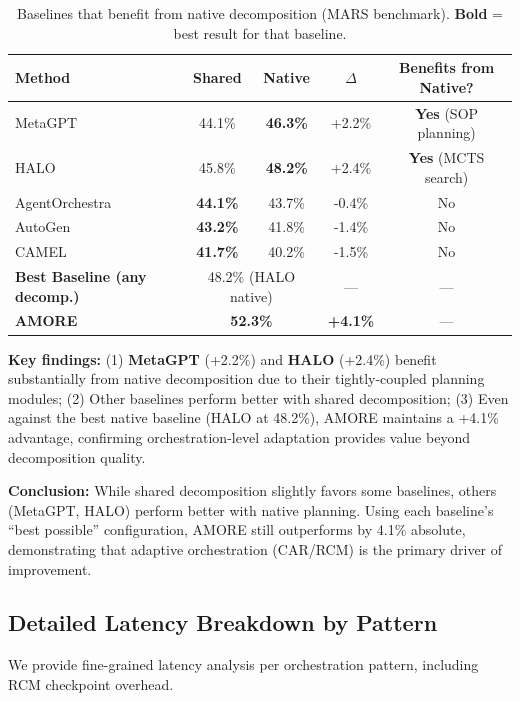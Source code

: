 \documentclass{article}
\theoremstyle{plain}
\theoremstyle{definition}
\theoremstyle{remark}
\begin{document}
\begin{table}[h]
	\caption{Baselines that benefit from native decomposition (MARS benchmark). \textbf{Bold} = best result for that baseline.}
	\label{tab:native-benefit}
	\centering
	\small
	\begin{tabular}{@{}lcccc@{}}
		\toprule
		\textbf{Method} & \textbf{Shared} & \textbf{Native} & \textbf{$\Delta$} & \textbf{Benefits from Native?} \\
		\midrule
		MetaGPT & 44.1\% & \textbf{46.3\%} & +2.2\% & \textbf{Yes} (SOP planning) \\
		HALO & 45.8\% & \textbf{48.2\%} & +2.4\% & \textbf{Yes} (MCTS search) \\
		AgentOrchestra & \textbf{44.1\%} & 43.7\% & -0.4\% & No \\
		AutoGen & \textbf{43.2\%} & 41.8\% & -1.4\% & No \\
		CAMEL & \textbf{41.7\%} & 40.2\% & -1.5\% & No \\
		\midrule
		\textbf{Best Baseline (any decomp.)} & \multicolumn{2}{c}{48.2\% (HALO native)} & --- & --- \\
		\textbf{AMORE} & \multicolumn{2}{c}{\textbf{52.3\%}} & \textbf{+4.1\%} & --- \\
		\bottomrule
	\end{tabular}
\end{table}

\textbf{Key findings:} (1) \textbf{MetaGPT} (+2.2\%) and \textbf{HALO} (+2.4\%) benefit substantially from native decomposition due to their tightly-coupled planning modules; (2) Other baselines perform better with shared decomposition; (3) Even against the best native baseline (HALO at 48.2\%), AMORE maintains a +4.1\% advantage, confirming orchestration-level adaptation provides value beyond decomposition quality.

\textbf{Conclusion:} While shared decomposition slightly favors some baselines, others (MetaGPT, HALO) perform better with native planning. Using each baseline's ``best possible'' configuration, AMORE still outperforms by 4.1\% absolute, demonstrating that adaptive orchestration (CAR/RCM) is the primary driver of improvement.

\subsection{Detailed Latency Breakdown by Pattern}
\label{sec:latency_per_pattern}

We provide fine-grained latency analysis per orchestration pattern, including RCM checkpoint overhead.
\end{document}
